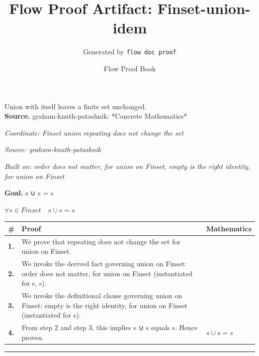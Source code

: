 \documentclass[11pt]{article}
\title{Flow Proof Artifact: Finset-union-idem}
\author{Generated by \texttt{flow doc proof}}
\date{Flow Proof Book}
\theoremstyle{definition}
\begin{document}
\maketitle
Union with itself leaves a finite set unchanged.\\[0.5em]
\textbf{Source.} graham-knuth-patashnik: *Concrete Mathematics*\\[0.5em]
\bigskip
{}\par
\smallskip\noindent\textit{Coordinate: Finset \cdot union \cdot repeating does not change the set}\par
\smallskip\noindent\textit{Source: graham-knuth-patashnik}\par
\smallskip\noindent\textit{Built on: order does not matter, for union on Finset, empty is the right identity, for union on Finset}\par
\medskip
\noindent\textbf{Goal.} s ∪ s = s\par
\noindent$\displaystyle \forall s \in Finset\quad s ∪ s = s$\par
\medskip
\noindent
\begin{tabular}{@{} >{\raggedright\arraybackslash}p{} >{\raggedright\arraybackslash}p{} >{\raggedleft\arraybackslash}p{} @{}}
\textbf{\#} & \textbf{Proof} & \textbf{Mathematics} \\
\midrule
\textbf{1.} & We prove that repeating does not change the set for union on Finset. & \\[0.45em]
\textbf{2.} & We invoke the derived fact governing union on Finset: order does not matter, for union on Finset (instantiated for s, s). & \\[0.45em]
\textbf{3.} & We invoke the definitional clause governing union on Finset: empty is the right identity, for union on Finset (instantiated for s). & \\[0.45em]
\textbf{4.} & From step 2 and step 3, this implies s ∪ s equals s. Hence proven. & $\displaystyle s ∪ s = s$ \\[0.45em]
\bottomrule
\end{tabular}
\label{thm:Finset-union-repeating_does_not_change_the_set}
\par\medskip\hrule
\end{document}
